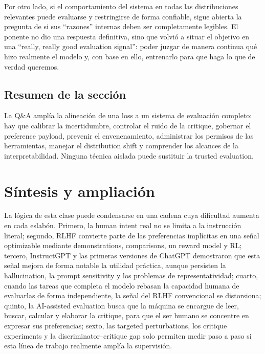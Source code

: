 \documentclass[a4paper]{article}
\begin{document}
Por otro lado, si el comportamiento del sistema en todas las distribuciones relevantes puede evaluarse y restringirse de forma confiable, sigue abierta la pregunta de si sus ``razones'' internas deben ser completamente legibles. El ponente no dio una respuesta definitiva, sino que volvió a situar el objetivo en una ``really, really good evaluation signal'': poder juzgar de manera continua qué hizo realmente el modelo y, con base en ello, entrenarlo para que haga lo que de verdad queremos.

\subsection{Resumen de la sección}

La Q\&A amplía la alineación de una loss a un sistema de evaluación completo: hay que calibrar la incertidumbre, controlar el ruido de la critique, gobernar el preference payload, prevenir el envenenamiento, administrar los permisos de las herramientas, manejar el distribution shift y comprender los alcances de la interpretabilidad. Ninguna técnica aislada puede sustituir la trusted evaluation.
\section{Síntesis y ampliación}

La lógica de esta clase puede condensarse en una cadena cuya dificultad aumenta en cada eslabón. Primero, la human intent real no se limita a la instrucción literal; segundo, RLHF convierte parte de las preferencias implícitas en una señal optimizable mediante demonstrations, comparisons, un reward model y RL; tercero, InstructGPT y las primeras versiones de ChatGPT demostraron que esta señal mejora de forma notable la utilidad práctica, aunque persisten la hallucination, la prompt sensitivity y los problemas de representatividad; cuarto, cuando las tareas que completa el modelo rebasan la capacidad humana de evaluarlas de forma independiente, la señal del RLHF convencional se distorsiona; quinto, la AI-assisted evaluation busca que la máquina se encargue de leer, buscar, calcular y elaborar la critique, para que el ser humano se concentre en expresar sus preferencias; sexto, las targeted perturbations, los critique experiments y la discriminator--critique gap solo permiten medir paso a paso si esta línea de trabajo realmente amplía la supervisión.
\end{document}
